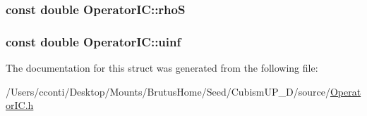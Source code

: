 \subsubsection[{rho\+S}]{\setlength{\rightskip}{0pt plus 5cm}const double Operator\+I\+C\+::rho\+S}\label{struct_operator_i_c_a1bbb1ac391ab30cbf83f51c2680b109e}
\hypertarget{struct_operator_i_c_ae9c336ea8e41f02409bf2680b0242c7f}{}
\subsubsection[{uinf}]{\setlength{\rightskip}{0pt plus 5cm}const double Operator\+I\+C\+::uinf}\label{struct_operator_i_c_ae9c336ea8e41f02409bf2680b0242c7f}


The documentation for this struct was generated from the following file\+:\begin{DoxyCompactItemize}
\item 
/\+Users/cconti/\+Desktop/\+Mounts/\+Brutus\+Home/\+Seed/\+Cubism\+U\+P\+\_\+D/source/\hyperlink{_operator_i_c_8h}{Operator\+I\+C.\+h}\end{DoxyCompactItemize}
